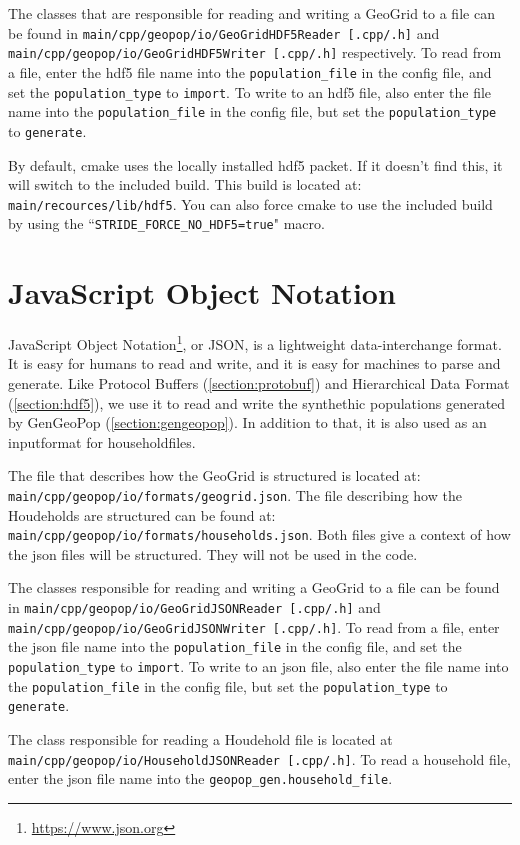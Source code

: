 The classes that are responsible for reading and writing a GeoGrid to a file can be found in \texttt{main/cpp/geopop/io/GeoGridHDF5Reader [.cpp/.h]} and \texttt{main/cpp/geopop/io/GeoGridHDF5Writer [.cpp/.h]} respectively. To read from a file, enter the hdf5 file name into the \texttt{population\_file} in the config file, and set the \texttt{population\_type} to \texttt{import}. To write to an hdf5 file, also enter the file name into the \texttt{population\_file} in the config file, but set the \texttt{population\_type} to \texttt{generate}.

By default, cmake uses the locally installed hdf5 packet. If it doesn't find this, it will switch to the included build. This build is located at: \texttt{main/recources/lib/hdf5}. You can also force cmake to use the included build by using the ``\texttt{STRIDE\_FORCE\_NO\_HDF5=true}" macro. 

\section{JavaScript Object Notation}
\label{section:json}

JavaScript Object Notation\footnote{\url{https://www.json.org}}, or JSON, is a lightweight data-interchange format. It is easy for humans to read and write, and it is easy for machines to parse and generate. Like Protocol Buffers (\ref{section:protobuf}) and Hierarchical Data Format (\ref{section:hdf5}), we use it to read and write the synthethic populations generated by GenGeoPop (\ref{section:gengeopop}). In addition to that, it is also used as an inputformat for householdfiles. 

The file that describes how the GeoGrid is structured is located at: \texttt{main/cpp/geopop/io/formats/geogrid.json}. The file describing how the Houdeholds are structured can be found at: \texttt{main/cpp/geopop/io/formats/households.json}. Both files give a context of how the json files will be structured. They will not be used in the code. 

The classes responsible for reading and writing a GeoGrid to a file can be found in \texttt{main/cpp/geopop/io/GeoGridJSONReader [.cpp/.h]} and \texttt{main/cpp/geopop/io/GeoGridJSONWriter [.cpp/.h]}. To read from a file, enter the json file name into the \texttt{population\_file} in the config file, and set the \texttt{population\_type} to \texttt{import}. To write to an json file, also enter the file name into the \texttt{population\_file} in the config file, but set the \texttt{population\_type} to \texttt{generate}.

The class responsible for reading a Houdehold file is located at \texttt{main/cpp/geopop/io/HouseholdJSONReader [.cpp/.h]}. To read a household file, enter the json file name into the \texttt{geopop\_gen.household\_file}. 




